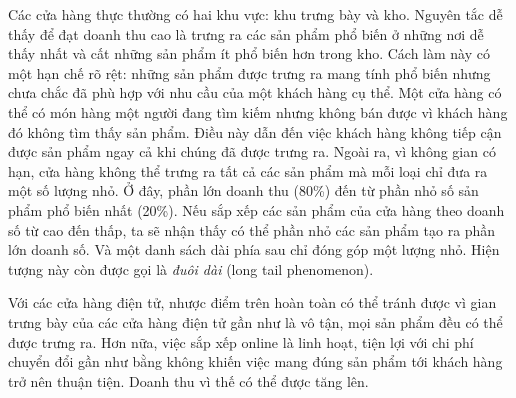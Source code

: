 Các {cửa hàng thực} thường có hai khu vực: khu trưng bày và kho. Nguyên tắc dễ thấy để đạt doanh thu cao là trưng ra các sản phẩm phổ biến ở những nơi dễ thấy nhất và cất những sản phẩm ít phổ biến hơn trong kho. Cách
làm này có một hạn chế rõ rệt: những sản phẩm được trưng ra mang tính phổ biến
nhưng chưa chắc đã phù hợp với nhu cầu của một khách hàng cụ thể. Một cửa hàng có thể có món hàng một người đang tìm kiếm nhưng không bán được vì khách hàng đó không tìm thấy sản phẩm. Điều này dẫn đến việc khách hàng không tiếp cận
được sản phẩm ngay cả khi chúng đã được trưng ra. Ngoài ra, vì không gian có
hạn, cửa hàng không thể trưng ra tất cả các sản phẩm mà mỗi loại chỉ đưa ra một
số lượng nhỏ. Ở đây, phần lớn doanh thu (80\%) đến từ phần nhỏ số sản phẩm phổ
biến nhất (20\%). Nếu sắp xếp các sản phẩm của cửa hàng theo doanh số từ cao đến
thấp, ta sẽ nhận thấy có thể phần nhỏ các sản phẩm tạo ra phần lớn doanh số. Và
một danh sách dài phía sau chỉ đóng góp một lượng nhỏ. Hiện tượng này còn
được gọi là \textit{đuôi dài} (long tail phenomenon).
 
Với các {cửa hàng điện tử}, nhược điểm trên hoàn toàn có thể tránh được vì {gian trưng bày} của các {cửa hàng điện tử} gần như là vô tận,
mọi sản phẩm đều có thể được trưng ra. Hơn nữa, việc sắp xếp online là linh
hoạt, tiện lợi với chi phí chuyển đổi gần như bằng không khiến việc mang đúng sản
phẩm tới khách hàng trở nên thuận tiện. Doanh thu vì thế có thể được tăng
lên.
 

 
 
 
